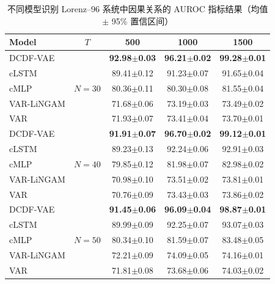 \begin{table}[htbp]
  \centering
  \caption{不同模型识别 Lorenz--96 系统中因果关系的 AUROC 指标结果（均值 $\pm$ 95\% 置信区间）}
  \label{tab:Lorenz_experiment}
  \begin{tabular}{lcccc}
    \toprule
    Model & $T$ & 500 & 1000 & 1500 \\
    \midrule
    DCDF-VAE & \multirow{5}{*}{$N=30$} & \textbf{92.98$\pm$0.03} & \textbf{96.21$\pm$0.02} & \textbf{99.28$\pm$0.01} \\
    cLSTM & & 89.41$\pm$0.12 & 91.23$\pm$0.07 & 91.65$\pm$0.04 \\
    cMLP & & 80.36$\pm$0.11 & 80.30$\pm$0.08 & 81.55$\pm$0.04 \\
    VAR-LiNGAM & & 71.68$\pm$0.06 & 73.19$\pm$0.03 & 73.49$\pm$0.02 \\
    VAR & & 71.93$\pm$0.07 & 73.41$\pm$0.04 & 73.70$\pm$0.01 \\
    \midrule
    DCDF-VAE & \multirow{5}{*}{$N=40$} & \textbf{91.91$\pm$0.07} & \textbf{96.70$\pm$0.02} & \textbf{99.12$\pm$0.01} \\
    cLSTM & & 89.23$\pm$0.13 & 92.24$\pm$0.06 & 92.91$\pm$0.03 \\
    cMLP & & 79.85$\pm$0.12 & 81.98$\pm$0.07 & 82.98$\pm$0.02 \\
    VAR-LiNGAM & & 70.98$\pm$0.10 & 73.51$\pm$0.02 & 73.81$\pm$0.01 \\
    VAR & & 70.76$\pm$0.09 & 73.43$\pm$0.03 & 73.86$\pm$0.02 \\
    \midrule
    DCDF-VAE & \multirow{5}{*}{$N=50$} & \textbf{91.45$\pm$0.06} & \textbf{96.09$\pm$0.04} & \textbf{98.87$\pm$0.01} \\
    cLSTM & & 89.99$\pm$0.09 & 92.25$\pm$0.07 & 93.07$\pm$0.03 \\
    cMLP & & 80.34$\pm$0.10 & 81.59$\pm$0.07 & 83.48$\pm$0.05 \\
    VAR-LiNGAM & & 72.21$\pm$0.09 & 74.09$\pm$0.05 & 74.16$\pm$0.01 \\
    VAR & & 71.81$\pm$0.08 & 73.68$\pm$0.06 & 74.03$\pm$0.02 \\
    \bottomrule
  \end{tabular}
\end{table}

